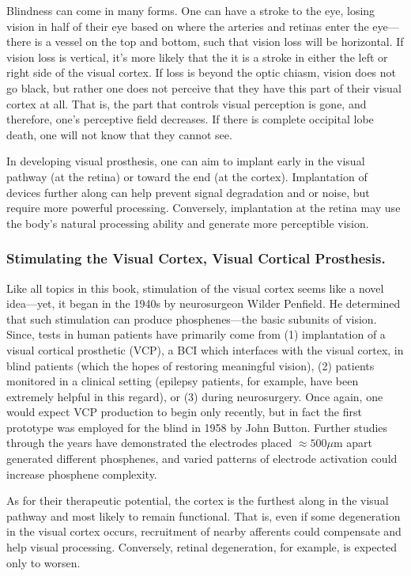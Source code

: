 Blindness can come in many forms. One can have a stroke to the eye, losing vision in half of their eye based on where the arteries and retinas enter the eye---there is a vessel on the top and bottom, such that vision loss will be horizontal. If vision loss is vertical, it's more likely that the it is a stroke in either the left or right side of the visual cortex. If loss is beyond the optic chiasm, vision does not go black, but rather one does not perceive that they have this part of their visual cortex at all. That is, the part that controls visual perception is gone, and therefore, one's perceptive field decreases. If there is complete occipital lobe death, one will not know that they cannot see. \newline

 In developing visual prosthesis, one can aim to implant early in the visual pathway (at the retina) or toward the end (at the cortex). Implantation of devices further along can help prevent signal degradation and or noise, but require more powerful processing. Conversely, implantation at the retina may use the body's natural processing ability and generate more perceptible vision. 

\subsubsection{Stimulating the Visual Cortex, Visual Cortical Prosthesis.}

 Like all topics in this book, stimulation of the visual cortex seems like a novel idea---yet, it began in the 1940s by neurosurgeon Wilder Penfield. He determined that such stimulation can produce phosphenes---the basic subunits of vision. Since, tests in human patients have primarily come from (1) implantation of a visual cortical prosthetic (VCP), a BCI which interfaces with the visual cortex, in blind patients (which the hopes of restoring meaningful vision), (2) patients monitored in a clinical setting (epilepsy patients, for example, have been extremely helpful in this regard), or (3) during neurosurgery. Once again, one would expect VCP production to begin only recently, but in fact the first prototype was employed for the blind in 1958 by John Button. Further studies through the years have demonstrated the electrodes placed $\approx 500\mu$m apart generated different phosphenes, and varied patterns of electrode activation could increase phosphene complexity.\newline

 As for their therapeutic potential, the cortex is the furthest along in the visual pathway and most likely to remain functional. That is, even if some degeneration in the visual cortex occurs, recruitment of nearby afferents could compensate and help visual processing. Conversely, retinal degeneration, for example, is expected only to worsen. \newline

